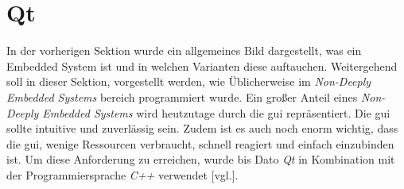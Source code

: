 \section{Qt}
\label{sec:qt}
In der vorherigen Sektion wurde ein allgemeines Bild dargestellt, was ein Embedded System
ist und in welchen Varianten diese auftauchen. Weitergehend soll in dieser Sektion,
vorgestellt werden, wie Üblicherweise im \emph{Non-Deeply Embedded Systems} bereich programmiert
wurde.
\newline
\newline
Ein großer Anteil eines \emph{Non-Deeply Embedded Systems} wird heutzutage durch die \ac{gui}
repräsentiert. Die \ac{gui} sollte intuitive und zuverlässig sein.
Zudem ist es auch noch enorm wichtig, dass die \ac{gui}, wenige Ressourcen verbraucht, schnell
reagiert und einfach einzubinden ist. Um diese Anforderung zu erreichen, wurde bis Dato \emph{Qt} in
Kombination mit der Programmiersprache \emph{C++} verwendet \cite{QtOnEmbeddedLinux}[vgl.].





